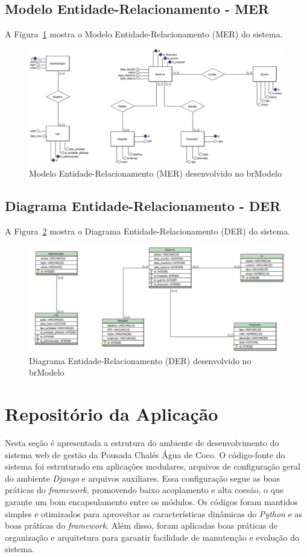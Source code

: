 \documentclass[
	12pt,				%
	openany,			%
	oneside,			%
	a4paper,			%
	english,			%
	french,				%
	spanish,			%
	brazil				%
	]{abntex2}
\begin{document}
\subsection{Modelo Entidade-Relacionamento - MER}

A Figura~\ref{fig:mer} mostra o Modelo Entidade-Relacionamento (MER) do sistema.

\begin{figure}[h!]
	\centering
	\includegraphics[width=\textwidth]{0406-MER.jpg}
	\caption{Modelo Entidade-Relacionamento (MER) desenvolvido no brModelo}
	\label{fig:mer}
\end{figure}
\subsection{Diagrama Entidade-Relacionamento - DER}
A Figura~\ref{fig:der} mostra o Diagrama Entidade-Relacionamento (DER) do sistema.

\begin{figure}[H]
	\centering
	\includegraphics[width=\textwidth]{0406-DER.jpg}
	\caption{Diagrama Entidade-Relacionamento (DER) desenvolvido no brModelo}
	\label{fig:der}
\end{figure}

\section{Repositório da Aplicação}Nesta seção é apresentada a estrutura do ambiente de desenvolvimento do sistema web de gestão da Pousada Chalés Água de Coco. O código-fonte do sistema foi estruturado em aplicações modulares, arquivos de configuração geral do ambiente \textit{Django} e arquivos auxiliares. Essa configuração segue as boas práticas do \textit{framework}, promovendo baixo acoplamento e alta coesão, o que garante um bom encapsulamento entre os módulos. Os códigos foram mantidos simples e otimizados para aproveitar as características dinâmicas do \textit{Python} e as boas práticas do \textit{framework}. Além disso, foram aplicadas boas práticas de organização e arquitetura para garantir facilidade de manutenção e evolução do sistema.
\end{document}
